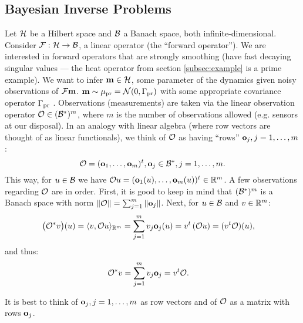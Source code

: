 \documentclass{amsart}
\numberwithin{equation}{section}
\begin{document}
\subsection{Bayesian  Inverse Problems}\label{section:abstract OED}
Let $\mathcal{H}$ be a Hilbert space and $\mathcal{B}$ a Banach space, both
infinite-dimensional. Consider $\mathcal{F}: \mathcal{H} \to \mathcal{B}$, a linear
operator (the ``forward operator''). We are interested in forward
operators that are strongly smoothing (have fast decaying singular
values --- the heat operator from section \ref{subsec:example} is a
prime example). We want to infer $\mathbf{m} \in \mathcal{H}$, some parameter of
the dynamics given noisy observations of $\mathcal{F} \mathbf{m}$. 
$\mathbf{m} \sim \mu_{\textup{pr}} = \mathcal{N}(0,\Gamma_{\textup{pr}})$ with some appropriate covariance
operator $\Gamma_{\textup{pr}}$ \cite{Stuart10}. Observations (measurements) are
taken via the linear observation operator $\mathcal{O} \in ( \mathcal{B}^* )^m$,
where $m$ is the number of observations allowed (e.g. sensors at our
disposal). In an analogy with linear algebra (where row vectors are
thought of as linear functionals), we think of $\mathcal{O}$ as having
``rows'' $\mathbf{o}_j, j=1,\dots,m$:
\begin{equation}\label{eq:O}
  \mathcal{O} = (\mathbf{o}_1,\dots, \mathbf{o}_m)^t, \mathbf{o}_j \in \mathcal{B}^*, j = 1,\dots,m.
\end{equation}
This way, for $u \in \mathcal{B}$ we have $\mathcal{O} u = (\mathbf{o}_1(u), \dots,
\mathbf{o}_m(u) )^t \in \mathbb{R}^m$.
A few observations regarding $\mathcal{O}$ are in order. First, it is good to
keep in mind that $( \mathcal{B}^* )^m$ is a Banach space with norm $\| \mathcal{O}
\| = \sum_{j=1}^m \|\mathbf{o}_j\|$. Next, for $u \in \mathcal{B}$ and $v\in
\mathbb{R}^m$:
\begin{align*}
  \big (\mathcal{O}^*v \big ) (u) &= \langle v, \mathcal{O} u \rangle_{\mathbb{R}^m} = \sum_{j=1}^m  v_j \mathbf{o}_j(u)
  = v^t \left ( \mathcal{O} u \right ) = (v^t \mathcal{O}) (u),
\end{align*}
and thus:
\begin{align}\label{eq:obs*}
  \mathcal{O}^*v &= \sum_{j=1}^m v_j \mathbf{o}_j = v^t \mathcal{O}.
\end{align}

\begin{observation}
  It is best to think of $\mathbf{o}_j,j=1,\dots,m$ as row vectors and of
  $\mathcal{O}$ as a matrix with rows $\mathbf{o}_j$. 
\end{observation}
\end{document}
